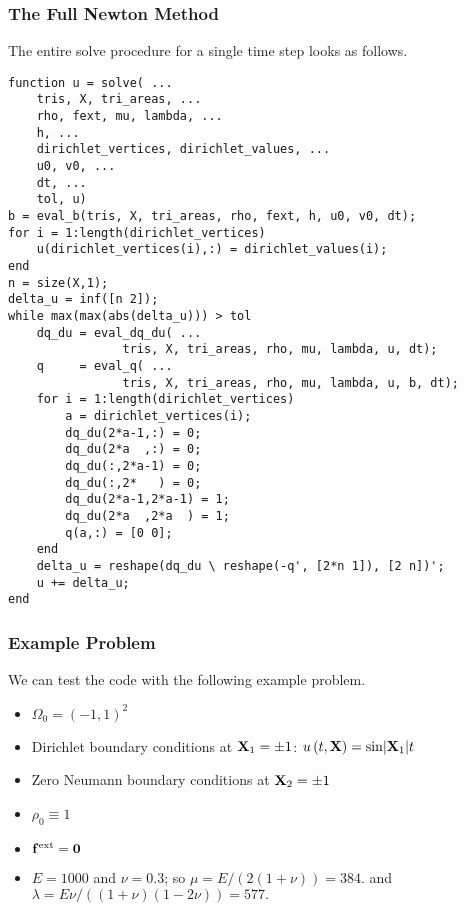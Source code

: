 \subsubsection{The Full Newton Method}

The entire solve procedure for a single time step looks as follows.
\begin{verbatim}
function u = solve( ...
    tris, X, tri_areas, ...
    rho, fext, mu, lambda, ...
    h, ...
    dirichlet_vertices, dirichlet_values, ...
    u0, v0, ...
    dt, ...
    tol, u)
b = eval_b(tris, X, tri_areas, rho, fext, h, u0, v0, dt);
for i = 1:length(dirichlet_vertices)
    u(dirichlet_vertices(i),:) = dirichlet_values(i);
end
n = size(X,1);
delta_u = inf([n 2]);
while max(max(abs(delta_u))) > tol
    dq_du = eval_dq_du( ...
                tris, X, tri_areas, rho, mu, lambda, u, dt);
    q     = eval_q( ...
                tris, X, tri_areas, rho, mu, lambda, u, b, dt);
    for i = 1:length(dirichlet_vertices)
        a = dirichlet_vertices(i);
        dq_du(2*a-1,:) = 0;
        dq_du(2*a  ,:) = 0;
        dq_du(:,2*a-1) = 0;
        dq_du(:,2*   ) = 0;
        dq_du(2*a-1,2*a-1) = 1;
        dq_du(2*a  ,2*a  ) = 1;
        q(a,:) = [0 0];
    end
    delta_u = reshape(dq_du \ reshape(-q', [2*n 1]), [2 n])';
    u += delta_u;
end
\end{verbatim}

\subsubsection{Example Problem}

We can test the code with the following example problem.
\begin{itemize}
\item $\Omega_0 = (-1,1)^2$
\item Dirichlet boundary conditions at $\mathbf{X}_1 = \pm 1$: $u \left( t, \mathbf{X} \right) = \sin \lvert \mathbf{X}_1 \rvert t$
\item Zero Neumann boundary conditions at $\mathbf{X}_2 = \pm 1$
\item $\rho_0 \equiv 1$
\item $\mathbf{f}^{\text{ext}} = \mathbf{0}$
\item $E = 1000$ and $\nu = 0.3$; so $\mu = E / (2 (1 + \nu)) = 384.$ and $\lambda = E \nu / ((1 + \nu) (1 - 2\nu)) = 577.$
\end{itemize}
